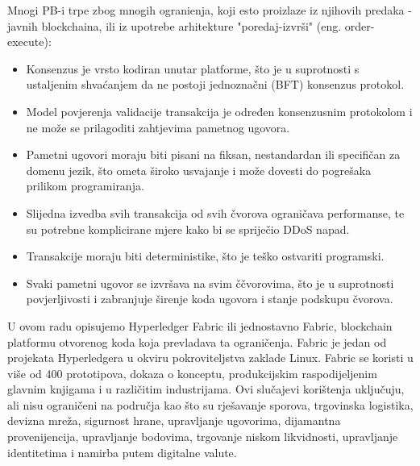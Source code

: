 \documentclass[times, utf8, diplomski]{fer}
\begin{document}
Mnogi PB-i trpe zbog mnogih ogranienja, koji esto proizlaze iz njihovih predaka - javnih blockchaina, ili iz upotrebe arhitekture "poredaj-izvrši" (eng. order-execute):

\begin{itemize}

\item Konsenzus je vrsto kodiran unutar platforme, što je u suprotnosti s ustaljenim shvaćanjem da ne postoji jednoznačni (BFT) konsenzus protokol.

\item Model povjerenja validacije transakcija je određen konsenzusnim protokolom i ne može se prilagoditi zahtjevima pametnog ugovora.

\item Pametni ugovori moraju biti pisani na fiksan, nestandardan ili specifičan za domenu jezik, što ometa široko usvajanje i može dovesti do pogrešaka prilikom programiranja.

\item Slijedna izvedba svih transakcija od svih čvorova ograničava performanse, te su potrebne komplicirane mjere kako bi se spriječio DDoS napad.

\item Transakcije moraju biti deterministike, što je teško ostvariti programski.

\item Svaki pametni ugovor se izvršava na svim ččvorovima, što je u suprotnosti povjerljivosti i zabranjuje širenje koda ugovora i stanje podskupu čvorova.

\end{itemize}

U ovom radu opisujemo Hyperledger Fabric ili jednostavno Fabric, blockchain
platformu otvorenog koda koja prevladava ta ograničenja. Fabric je jedan od projekata Hyperledgera u okviru pokroviteljstva zaklade Linux. Fabric se koristi u više od 400 prototipova, dokaza o konceptu, produkcijskim raspodijeljenim glavnim knjigama i u različitim industrijama. Ovi slučajevi korištenja uključuju, ali nisu ograničeni na područja kao što su rješavanje sporova, trgovinska logistika, devizna mreža, sigurnost hrane, upravljanje ugovorima, dijamantna provenijencija, upravljanje bodovima, trgovanje niskom likvidnosti, upravljanje identitetima i namirba putem digitalne valute.
\end{document}
